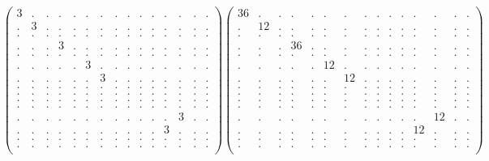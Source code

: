 \documentclass[12pt,a4paper]{amsart}
\begin{document}
\begin{align*}
\left(\begin{array}{rrrrrrrrrrrrrrr}%
3&.&.&.&.&.&.&.&.&.&.&.&.&.&.\\%
.&3&.&.&.&.&.&.&.&.&.&.&.&.&.\\%
.&.&.&.&.&.&.&.&.&.&.&.&.&.&.\\%
.&.&.&3&.&.&.&.&.&.&.&.&.&.&.\\%
.&.&.&.&.&.&.&.&.&.&.&.&.&.&.\\%
.&.&.&.&.&3&.&.&.&.&.&.&.&.&.\\%
.&.&.&.&.&.&3&.&.&.&.&.&.&.&.\\%
.&.&.&.&.&.&.&.&.&.&.&.&.&.&.\\%
.&.&.&.&.&.&.&.&.&.&.&.&.&.&.\\%
.&.&.&.&.&.&.&.&.&.&.&.&.&.&.\\%
.&.&.&.&.&.&.&.&.&.&.&.&.&.&.\\%
.&.&.&.&.&.&.&.&.&.&.&.&3&.&.\\%
.&.&.&.&.&.&.&.&.&.&.&3&.&.&.\\%
.&.&.&.&.&.&.&.&.&.&.&.&.&.&.\\%
.&.&.&.&.&.&.&.&.&.&.&.&.&.&.\\%
\end{array}\right)%
\left(\begin{array}{rrrrrrrrrrrrrrr}%
36&.&.&.&.&.&.&.&.&.&.&.&.&.&.\\%
.&12&.&.&.&.&.&.&.&.&.&.&.&.&.\\%
.&.&.&.&.&.&.&.&.&.&.&.&.&.&.\\%
.&.&.&36&.&.&.&.&.&.&.&.&.&.&.\\%
.&.&.&.&.&.&.&.&.&.&.&.&.&.&.\\%
.&.&.&.&.&12&.&.&.&.&.&.&.&.&.\\%
.&.&.&.&.&.&12&.&.&.&.&.&.&.&.\\%
.&.&.&.&.&.&.&.&.&.&.&.&.&.&.\\%
.&.&.&.&.&.&.&.&.&.&.&.&.&.&.\\%
.&.&.&.&.&.&.&.&.&.&.&.&.&.&.\\%
.&.&.&.&.&.&.&.&.&.&.&.&.&.&.\\%
.&.&.&.&.&.&.&.&.&.&.&.&12&.&.\\%
.&.&.&.&.&.&.&.&.&.&.&12&.&.&.\\%
.&.&.&.&.&.&.&.&.&.&.&.&.&.&.\\%
.&.&.&.&.&.&.&.&.&.&.&.&.&.&.\\%
\end{array}\right)%
\end{align*}
\end{document}
